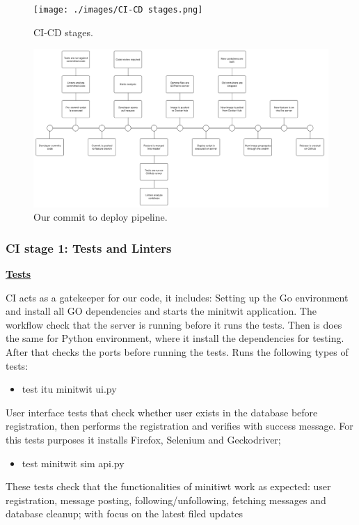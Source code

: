 \documentclass{article}
\begin{document}
\begin{figure}[ht]
    \centering
    \texttt{[image: ./images/CI-CD stages.png]}
    \caption{CI-CD stages.}
    \label{fig:CI-CD stages}
\end{figure}

\begin{figure}[ht]
    \centering
    \includegraphics[width=1.0\textwidth]{./images/CommitToDeploy.png} 
    \caption{Our commit to deploy pipeline.}
    \label{fig:Our commit to deploy pipeline.}
\end{figure}


\subsubsection{CI stage 1: Tests and Linters}
\noindent \textbf{\underline{Tests}} 

CI acts as a gatekeeper for our code, it includes: 
Setting up the Go environment and install all GO dependencies and starts the minitwit application. The workflow check that the server is running before it runs the tests.
Then is does the same for Python environment, where it install the dependencies for testing. After that checks the ports before running the tests.
Runs the following types of tests:
\begin{itemize}
    \item test itu minitwit ui.py
\end{itemize}
User interface tests that check whether user exists in the database before registration, then performs the registration and verifies with success message. For this tests purposes it installs Firefox, Selenium and Geckodriver;

\begin{itemize}
    \item test minitwit sim api.py
\end{itemize}
These tests check that the functionalities of minitiwt work as expected: user registration, message posting, following/unfollowing, fetching messages and database cleanup; with focus on the latest filed updates
    
\end{document}
